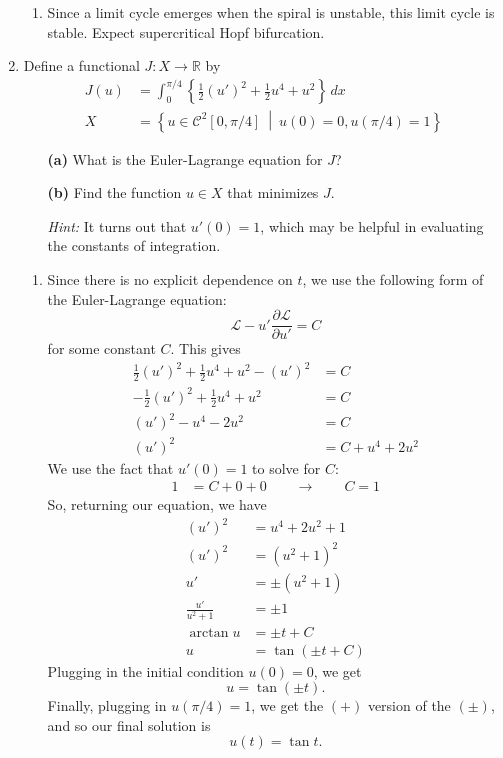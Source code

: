\documentclass[10pt,letterpaper]{report}
\newcommand{\R}{\mathbb{R}}
\newcommand{\CF}{\mathcal{C}}
\newcommand{\so}{\qquad \rightarrow \qquad}
\newcommand{\sett}[2]{\left\{{#1} \ \middle| \ {#2}\right\}}
\newcommand{\pp}[2]{\frac{\partial{#1}}{\partial{#2}}}
\begin{document}
\begin{enumerate}
\begin{enumerate}
    \item Since a limit cycle emerges when the spiral is unstable, this limit cycle is stable. Expect supercritical Hopf bifurcation.
\end{enumerate}

\item \begin{qbox}
Define a functional $J : X \to \R$ by
\begin{align*}
    J(u) &= \int_0^{\pi/4} \left\{\frac{1}{2}(u')^2 + \frac{1}{2}u^4 + u^2\right\}\,dx
    \\
    X &= \sett{u \in \CF^2[0,\pi/4]}{u(0) = 0, u(\pi/4) = 1}
\end{align*}
\begin{itemize}
    \item[\textbf{(a)}]What is the Euler-Lagrange equation for $J$?
    
    \item[\textbf{(b)}] Find the function $u \in X$ that minimizes $J$.
    
    \textit{Hint:} It turns out that $u'(0) = 1$, which may be helpful in evaluating the constants of integration.
\end{itemize}
\end{qbox}

\begin{enumerate}
    \item Since there is no explicit dependence on $t$, we use the following form of the Euler-Lagrange equation:
    \[
    \mathcal{L} - u' \pp{\mathcal L}{u'} = C
    \]
    for some constant $C$. This gives
    \begin{align*}
        \frac{1}{2}(u')^2 + \frac{1}{2}u^4 + u^2 - (u')^2 &= C
        \\
        -\frac{1}{2}(u')^2 + \frac{1}{2}u^4 + u^2 &= C
        \\
        (u')^2 -u^4 - 2u^2 &= C
        \\
        (u')^2 &= C + u^4 + 2u^2 
    \end{align*}
    We use the fact that $u'(0) = 1$ to solve for $C:$
    \begin{align*}
        1 &= C + 0 + 0 \so C = 1
    \end{align*}
    So, returning our equation, we have
    \begin{align*}
        (u')^2 &= u^4 + 2u^2 + 1 \\
        (u')^2 &= (u^2 + 1)^2 \\
        u' &= \pm (u^2 + 1) \\
        \frac{u'}{u^2 + 1} &= \pm 1 \\
        \arctan u &= \pm t + C \\
        u &= \tan(\pm t + C)
    \end{align*}
    Plugging in the initial condition $u(0) = 0$, we get
    \[
    u = \tan(\pm t).
    \]
    Finally, plugging in $u(\pi/4) = 1$, we get the $(+)$ version of the $(\pm)$, and so our final solution is
    \[
    u(t) = \tan t.
    \]
\end{enumerate}


\end{enumerate}
\end{document}
